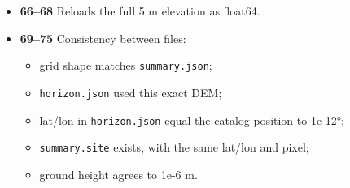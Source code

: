 \documentclass[11pt,a4paper]{article}
\providecommand{\tightlist}{\setlength{\itemsep}{0pt}\setlength{\parskip}{0pt}}
\begin{document}
\begin{itemize}
\tightlist
\item
  \textbf{66--68} Reloads the full 5 m elevation as float64.
\item
  \textbf{69--75} Consistency between files:

  \begin{itemize}
  \tightlist
  \item
    grid shape matches \texttt{summary.json};
  \item
    \texttt{horizon.json} used this exact DEM;
  \item
    lat/lon in \texttt{horizon.json} equal the catalog
    position to 1e-12°;
  \item
    \texttt{summary.site} exists, with the same lat/lon
    and pixel;
  \item
    ground height agrees to 1e-6 m.
  \end{itemize}


\end{itemize}
\end{document}
